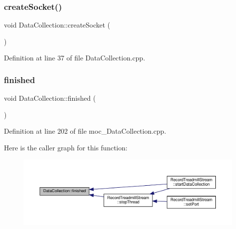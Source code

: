 \subsubsection{\texorpdfstring{create\+Socket()}{createSocket()}}
{\footnotesize\ttfamily void Data\+Collection\+::create\+Socket (\begin{DoxyParamCaption}{ }\end{DoxyParamCaption})}



Definition at line 37 of file Data\+Collection.\+cpp.

\mbox{\label{class_data_collection_a5473a04c2bb1b75d9798ac097cc4efef}} 
\subsubsection{\texorpdfstring{finished}{finished}}
{\footnotesize\ttfamily void Data\+Collection\+::finished (\begin{DoxyParamCaption}{ }\end{DoxyParamCaption})\hspace{0.3cm}{\ttfamily [signal]}}



Definition at line 202 of file moc\+\_\+\+Data\+Collection.\+cpp.

Here is the caller graph for this function\+:
\nopagebreak
\begin{figure}[H]
\begin{center}
\leavevmode
\includegraphics[width=350pt]{class_data_collection_a5473a04c2bb1b75d9798ac097cc4efef_icgraph}
\end{center}
\end{figure}
\mbox{\label{class_data_collection_a72136206b4b1232a442e2ce89c62837a}} 
